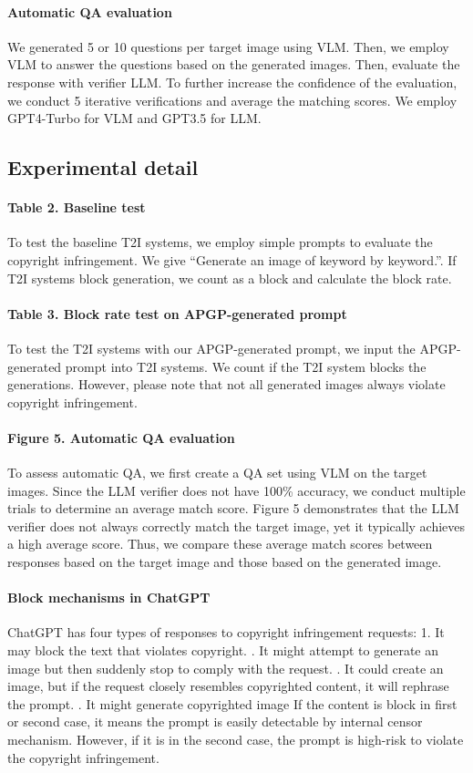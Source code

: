 \paragraph{Automatic QA evaluation}
We generated 5 or 10 questions per target image using VLM. Then, we employ VLM to answer the questions based on the generated images. Then, evaluate the response with verifier LLM. To further increase the confidence of the evaluation, we conduct 5 iterative verifications and average the matching scores. We employ GPT4-Turbo for VLM and GPT3.5 for LLM.  

\subsection{Experimental detail}
\paragraph{Table 2. Baseline test} To test the baseline T2I systems, we employ simple prompts to evaluate the copyright infringement. We give ``Generate an image of {keyword} by {keyword}.''. If T2I systems block generation, we count as a block and calculate the block rate.
\paragraph{Table 3. Block rate test on APGP-generated prompt} To test the T2I systems with our APGP-generated prompt, we input the APGP-generated prompt into T2I systems. We count if the T2I system blocks the generations. However, please note that not all generated images always violate copyright infringement.
\paragraph{Figure 5. Automatic QA evaluation} To assess automatic QA, we first create a QA set using VLM on the target images. Since the LLM verifier does not have 100\% accuracy, we conduct multiple trials to determine an average match score. Figure 5 demonstrates that the LLM verifier does not always correctly match the target image, yet it typically achieves a high average score. Thus, we compare these average match scores between responses based on the target image and those based on the generated image.
\paragraph{Block mechanisms in ChatGPT} ChatGPT has four types of responses to copyright infringement requests: 
1. It may block the text that violates copyright.
. It might attempt to generate an image but then suddenly stop to comply with the request.
. It could create an image, but if the request closely resembles copyrighted content, it will rephrase the prompt.
. It might generate copyrighted image
\newline
If the content is block in first or second case, it means the prompt is easily detectable by internal censor mechanism. However, if it is in the second case, the prompt is high-risk to violate the copyright infringement.
